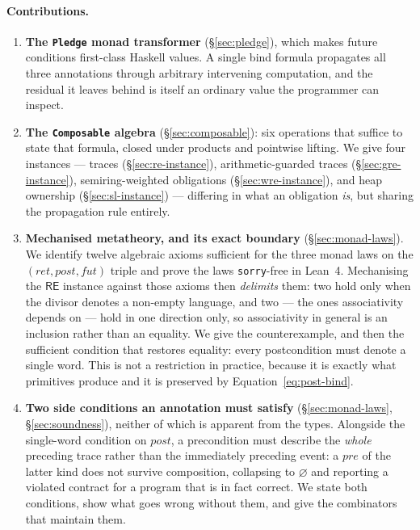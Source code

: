 \documentclass[acmsmall,screen]{acmart}
\newcommand{\RE}{\mathsf{RE}}
\newcommand{\pre}{\mathit{pre}}
\newcommand{\post}{\mathit{post}}
\newcommand{\fut}{\mathit{fut}}
\newcommand{\ret}{\mathit{ret}}
\begin{document}
\paragraph{Contributions.}
\begin{enumerate}
  \item \textbf{The \lstinline{Pledge} monad transformer}
        (\S\ref{sec:pledge}), which makes future conditions first-class
        Haskell values.
        A single bind formula propagates all three annotations through
        arbitrary intervening computation, and the residual it leaves
        behind is itself an ordinary value the programmer can inspect.

  \item \textbf{The \lstinline{Composable} algebra}
        (\S\ref{sec:composable}): six operations that suffice to state
        that formula, closed under products and pointwise lifting.
        We give four instances --- traces
        (\S\ref{sec:re-instance}), arithmetic-guarded traces
        (\S\ref{sec:gre-instance}), semiring-weighted obligations
        (\S\ref{sec:wre-instance}), and heap ownership
        (\S\ref{sec:sl-instance}) --- differing in what an obligation
        \emph{is}, but sharing the propagation rule entirely.

  \item \textbf{Mechanised metatheory, and its exact boundary}
        (\S\ref{sec:monad-laws}).
        We identify twelve algebraic axioms sufficient for the three monad
        laws on the $(\ret, \post, \fut)$ triple and prove the laws
        \lstinline{sorry}-free in Lean~4.
        Mechanising the $\RE$ instance against those axioms then
        \emph{delimits} them: two hold only when the divisor denotes a
        non-empty language, and two --- the ones associativity depends on
        --- hold in one direction only, so associativity in general is an
        inclusion rather than an equality.
        We give the counterexample, and then the sufficient condition that
        restores equality: every postcondition must denote a single word.
        This is not a restriction in practice, because it is exactly what
        primitives produce and it is preserved by
        Equation~\eqref{eq:post-bind}.

  \item \textbf{Two side conditions an annotation must satisfy}
        (\S\ref{sec:monad-laws}, \S\ref{sec:soundness}), neither of which
        is apparent from the types.
        Alongside the single-word condition on $\post$, a precondition must
        describe the \emph{whole} preceding trace rather than the
        immediately preceding event: a $\pre$ of the latter kind does not
        survive composition, collapsing to $\varnothing$ and reporting a
        violated contract for a program that is in fact correct.
        We state both conditions, show what goes wrong without them, and
        give the combinators that maintain them.


\end{enumerate}
\end{document}
